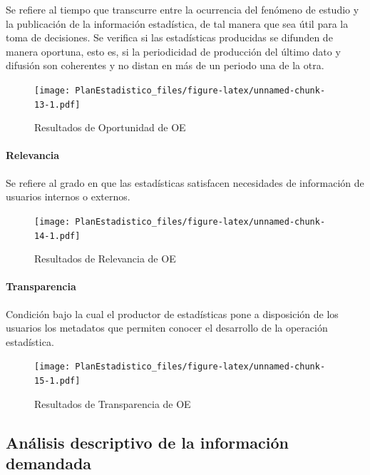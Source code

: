 \documentclass[
]{book}
\begin{document}
Se refiere al tiempo que transcurre entre la ocurrencia del fenómeno de estudio y la publicación de la información estadística, de tal manera que sea útil para la toma de decisiones. Se verifica si las estadísticas producidas se difunden de manera oportuna, esto es, si la periodicidad de producción del último dato y difusión son coherentes y no distan en más de un periodo una de la otra.

\begin{figure}
\centering
\texttt{[image: PlanEstadistico\_files/figure-latex/unnamed-chunk-13-1.pdf]}
\caption{\label{fig:unnamed-chunk-13}Resultados de Oportunidad de OE}
\end{figure}

\hypertarget{relevancia}{%
\paragraph{Relevancia}\label{relevancia}}

Se refiere al grado en que las estadísticas satisfacen necesidades de información de
usuarios internos o externos.

\begin{figure}
\centering
\texttt{[image: PlanEstadistico\_files/figure-latex/unnamed-chunk-14-1.pdf]}
\caption{\label{fig:unnamed-chunk-14}Resultados de Relevancia de OE}
\end{figure}

\hypertarget{transparencia}{%
\paragraph{Transparencia}\label{transparencia}}

Condición bajo la cual el productor de estadísticas pone a disposición de los
usuarios los metadatos que permiten conocer el desarrollo de la operación estadística.

\begin{figure}
\centering
\texttt{[image: PlanEstadistico\_files/figure-latex/unnamed-chunk-15-1.pdf]}
\caption{\label{fig:unnamed-chunk-15}Resultados de Transparencia de OE}
\end{figure}

\hypertarget{anuxe1lisis-descriptivo-de-la-informaciuxf3n-demandada}{%
\subsection{Análisis descriptivo de la información demandada}\label{anuxe1lisis-descriptivo-de-la-informaciuxf3n-demandada}}
\end{document}
